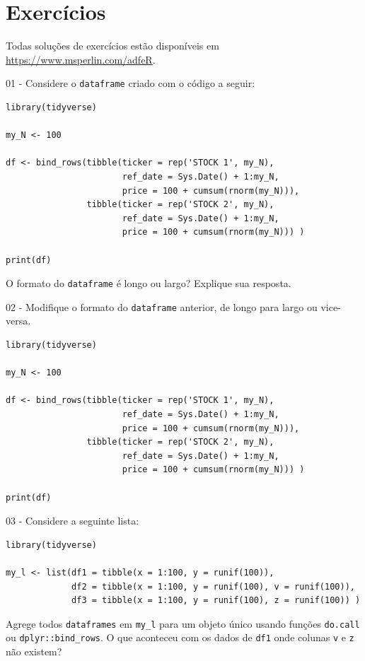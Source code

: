\documentclass[
  11pt,
]{book}
\begin{document}
\hypertarget{exerc-limpando-estruturando}{%
\section{Exercícios}\label{exerc-limpando-estruturando}}

Todas soluções de exercícios estão disponíveis em \url{https://www.msperlin.com/adfeR}.

01 -
Considere o \texttt{dataframe} criado com o código a seguir:

\begin{verbatim}
library(tidyverse)

my_N <- 100

df <- bind_rows(tibble(ticker = rep('STOCK 1', my_N),
                       ref_date = Sys.Date() + 1:my_N,
                       price = 100 + cumsum(rnorm(my_N))),
                tibble(ticker = rep('STOCK 2', my_N),
                       ref_date = Sys.Date() + 1:my_N,
                       price = 100 + cumsum(rnorm(my_N))) )

print(df)
\end{verbatim}

O formato do \texttt{dataframe} é longo ou largo? Explique sua resposta.

02 -
Modifique o formato do \texttt{dataframe} anterior, de longo para largo ou vice-versa.

\begin{verbatim}
library(tidyverse)

my_N <- 100

df <- bind_rows(tibble(ticker = rep('STOCK 1', my_N),
                       ref_date = Sys.Date() + 1:my_N,
                       price = 100 + cumsum(rnorm(my_N))),
                tibble(ticker = rep('STOCK 2', my_N),
                       ref_date = Sys.Date() + 1:my_N,
                       price = 100 + cumsum(rnorm(my_N))) )

print(df)
\end{verbatim}

03 -
Considere a seguinte lista:

\begin{verbatim}
library(tidyverse)

my_l <- list(df1 = tibble(x = 1:100, y = runif(100)),
             df2 = tibble(x = 1:100, y = runif(100), v = runif(100)),
             df3 = tibble(x = 1:100, y = runif(100), z = runif(100)) )
\end{verbatim}

Agrege todos \texttt{dataframes} em \texttt{my\_l} para um objeto único usando funções \texttt{do.call} ou \texttt{dplyr::bind\_rows}. O que aconteceu com os dados de \texttt{df1} onde colunas \texttt{v} e \texttt{z} não existem?
\end{document}
